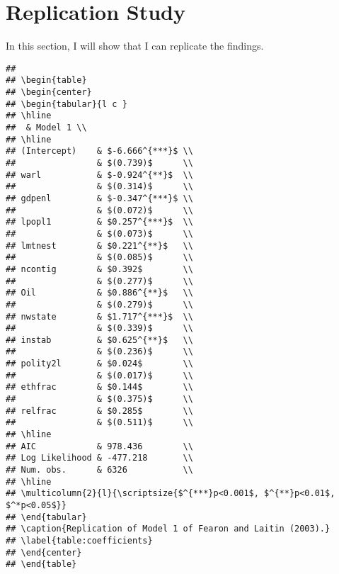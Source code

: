 \documentclass[12pt]{article}\usepackage[]{graphicx}\usepackage[]{color}
\makeatletter
\newenvironment{kframe}{%
 \def\at@end@of@kframe{}%
 \ifinner\ifhmode%
  \def\at@end@of@kframe{\end{minipage}}%
  \begin{minipage}{\columnwidth}%
 \fi\fi%
 \def\FrameCommand##1{\hskip\@totalleftmargin \hskip-\fboxsep
 \colorbox{shadecolor}{##1}\hskip-\fboxsep
     \hskip-\linewidth \hskip-\@totalleftmargin \hskip\columnwidth}%
 \MakeFramed {\advance\hsize-\width
   \@totalleftmargin\z@ \linewidth\hsize
   \@setminipage}}%
 {\par\unskip\endMakeFramed%
 \at@end@of@kframe}
\newenvironment{knitrout}{}{} %
\makeatother
\begin{document}
\section*{Replication Study}
In this section, I will show that I can replicate the findings.
\begin{knitrout}
\color{fgcolor}\begin{kframe}
\begin{verbatim}
## 
## \begin{table}
## \begin{center}
## \begin{tabular}{l c }
## \hline
##  & Model 1 \\
## \hline
## (Intercept)    & $-6.666^{***}$ \\
##                & $(0.739)$      \\
## warl           & $-0.924^{**}$  \\
##                & $(0.314)$      \\
## gdpenl         & $-0.347^{***}$ \\
##                & $(0.072)$      \\
## lpopl1         & $0.257^{***}$  \\
##                & $(0.073)$      \\
## lmtnest        & $0.221^{**}$   \\
##                & $(0.085)$      \\
## ncontig        & $0.392$        \\
##                & $(0.277)$      \\
## Oil            & $0.886^{**}$   \\
##                & $(0.279)$      \\
## nwstate        & $1.717^{***}$  \\
##                & $(0.339)$      \\
## instab         & $0.625^{**}$   \\
##                & $(0.236)$      \\
## polity2l       & $0.024$        \\
##                & $(0.017)$      \\
## ethfrac        & $0.144$        \\
##                & $(0.375)$      \\
## relfrac        & $0.285$        \\
##                & $(0.511)$      \\
## \hline
## AIC            & 978.436        \\
## Log Likelihood & -477.218       \\
## Num. obs.      & 6326           \\
## \hline
## \multicolumn{2}{l}{\scriptsize{$^{***}p<0.001$, $^{**}p<0.01$, $^*p<0.05$}}
## \end{tabular}
## \caption{Replication of Model 1 of Fearon and Laitin (2003).}
## \label{table:coefficients}
## \end{center}
## \end{table}
\end{verbatim}
\end{kframe}
\end{knitrout}
\end{document}
